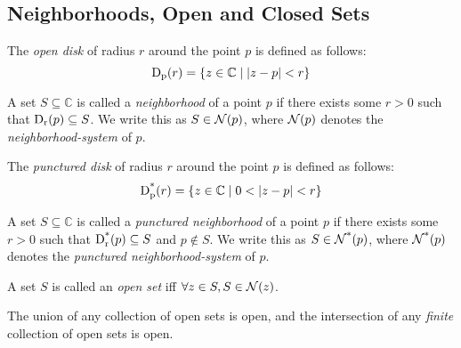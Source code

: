 \documentclass{refbook}
\begin{document}
\subsection{Neighborhoods, Open and Closed Sets}
\begin{definition}
The \emph{open disk} of radius $r$ around the point $p$ is defined as follows:
\begin{equation*}\disk{r}{p} = \{z \in \mathbb{C} \mid \modulus{z-p} < r\}\end{equation*}
\end{definition}
\begin{definition}
A set $S \subseteq \mathbb{C}$ is called a \emph{neighborhood} of a point $p$ if there exists some $r > 0$ such that $\disk{p}{r} \subseteq S$.
We write this as $S \in \nbhd{p}$, where $\nbhd{p}$ denotes the \emph{neighborhood-system} of $p$.
\end{definition}
\begin{definition}
The \emph{punctured disk} of radius $r$ around the point $p$ is defined as follows:
\begin{equation*}\pdisk{r}{p} = \{z \in \mathbb{C} \mid 0<\modulus{z-p} < r\}\end{equation*}
\end{definition}
\begin{definition}
A set $S \subseteq \mathbb{C}$ is called a \emph{punctured neighborhood} of a point $p$ if there exists some $r > 0$ such that $\pdisk{p}{r} \subseteq S$ and $p \notin S$.
We write this as $S \in \pnbhd{p}$, where $\pnbhd{p}$ denotes the \emph{punctured neighborhood-system} of $p$.
\end{definition}
\begin{definition}
A set $S$ is called an \emph{open set} iff $\forall z \in S, S \in \nbhd{z}$.
\end{definition}
\begin{lemma}
The union of any collection of open sets is open, and the intersection of any \emph{finite} collection of open sets is open.
\end{lemma}
\end{document}
